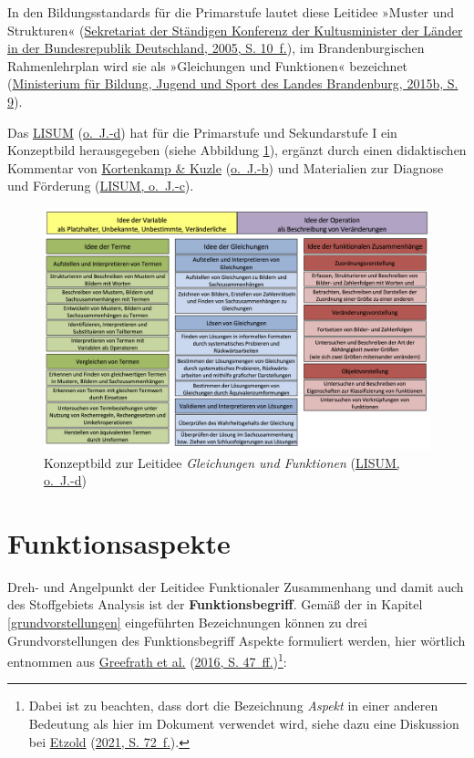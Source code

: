\documentclass[
  ngerman,
]{scrbook}
\theoremstyle{definition}
\theoremstyle{definition}
\theoremstyle{definition}
\theoremstyle{definition}
\theoremstyle{remark}
\begin{document}
In den Bildungsstandards für die Primarstufe lautet diese Leitidee »Muster und Strukturen« (\protect\hyperlink{ref-KMK2005}{Sekretariat der Ständigen Konferenz der Kultusminister der Länder in der Bundesrepublik Deutschland, 2005, S. 10~f.}), im Brandenburgischen Rahmenlehrplan wird sie als »Gleichungen und Funktionen« bezeichnet (\protect\hyperlink{ref-MinisteriumfurBildungJugendundSportdesLandesBrandenburg2015a}{Ministerium für Bildung, Jugend und Sport des Landes Brandenburg, 2015b, S. 9}).

Das \protect\hyperlink{ref-LISUMd}{LISUM} (\protect\hyperlink{ref-LISUMd}{o.~J.-d}) hat für die Primarstufe und Sekundarstufe I ein Konzeptbild herausgegeben (siehe Abbildung \ref{fig:KonzeptFunktionen}), ergänzt durch einen didaktischen Kommentar von \protect\hyperlink{ref-Kortenkampa}{Kortenkamp \& Kuzle} (\protect\hyperlink{ref-Kortenkampa}{o.~J.-b}) und Materialien zur Diagnose und Förderung (\protect\hyperlink{ref-LISUMc}{LISUM, o.~J.-c}).



\begin{figure}

{\centering \includegraphics[width=0.9\linewidth]{pictures/D-KonzeptFunktion} 

}

\caption{Konzeptbild zur Leitidee \emph{Gleichungen und Funktionen} (\protect\hyperlink{ref-LISUMd}{LISUM, o.~J.-d})}\label{fig:KonzeptFunktionen}
\end{figure}

\hypertarget{funktionsaspekte}{%
\section{Funktionsaspekte}\label{funktionsaspekte}}

Dreh- und Angelpunkt der Leitidee Funktionaler Zusammenhang und damit auch des Stoffgebiets Analysis ist der \textbf{Funktionsbegriff}. Gemäß der in Kapitel \ref{grundvorstellungen} eingeführten Bezeichnungen können zu drei Grundvorstellungen des Funktionsbegriff Aspekte formuliert werden, hier wörtlich entnommen aus \protect\hyperlink{ref-Greefrath2016}{Greefrath et al.} (\protect\hyperlink{ref-Greefrath2016}{2016, S. 47~ff.})\footnote{Dabei ist zu beachten, dass dort die Bezeichnung \emph{Aspekt} in einer anderen Bedeutung als hier im Dokument verwendet wird, siehe dazu eine Diskussion bei \protect\hyperlink{ref-Etzold2021}{Etzold} (\protect\hyperlink{ref-Etzold2021}{2021, S. 72~f.}).}:
\end{document}
